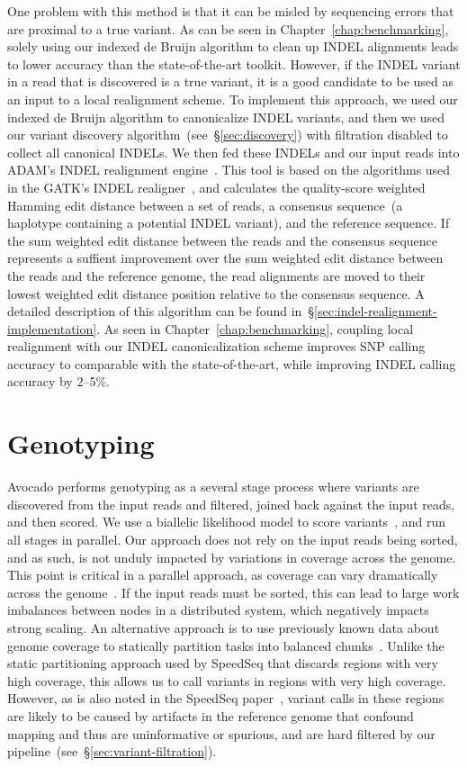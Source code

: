 \documentclass[phd]{ucbthesis}
\begin{document}
One problem with this method is that it can be misled by sequencing errors
that are proximal to a true variant. As can be seen in Chapter~\ref{chap:benchmarking},
solely using our indexed de Bruijn algorithm to clean up INDEL alignments leads
to lower accuracy than the state-of-the-art toolkit. However, if the INDEL
variant in a read that is discovered is a true variant, it is a good candidate
to be used as an input to a local realignment scheme.  To implement this
approach, we used our indexed de Bruijn algorithm to canonicalize INDEL variants,
and then we used our variant discovery algorithm~(see~\S\ref{sec:discovery})
with filtration disabled to collect all canonical INDELs. We then fed these
INDELs and our input reads into {ADAM}'s INDEL realignment
engine~\cite{massie13, nothaft15}. This tool is based on the algorithms used in
the {GATK}'s INDEL realigner~\cite{depristo11}, and calculates the quality-score
weighted Hamming edit distance between a set of reads, a consensus sequence~(a
haplotype containing a potential INDEL variant), and the reference sequence. If
the sum weighted edit distance between the reads and the consensus sequence
represents a suffient improvement over the sum weighted edit distance between
the reads and the reference genome, the read alignments are moved to their
lowest weighted edit distance position relative to the consensus sequence.
A detailed description of this algorithm can be found in~\S\ref{sec:indel-realignment-implementation}.
As seen in Chapter~\ref{chap:benchmarking}, coupling local realignment with our INDEL
canonicalization scheme improves SNP calling accuracy to comparable with the
state-of-the-art, while improving INDEL calling accuracy by 2--5\%.

\section{Genotyping}
\label{sec:genotyping}

{Avocado} performs genotyping as a several stage process where variants
are discovered from the input reads and filtered, joined back against the input
reads, and then scored. We use a biallelic likelihood model to score
variants~\cite{li11}, and run all stages in parallel. Our approach does not
rely on the input reads being sorted, and as such, is not unduly impacted by
variations in coverage across the genome. This point is critical in a parallel
approach, as coverage can vary dramatically across the genome~\cite{pinard06}.
If the input reads must be sorted, this can lead to large work imbalances
between nodes in a distributed system, which negatively impacts strong scaling.
An alternative approach is to use previously known data about genome coverage
to statically partition tasks into balanced chunks~\cite{chiang15}. Unlike the
static partitioning approach used by {SpeedSeq} that discards regions with
very high coverage, this allows us to call variants in regions with very high
coverage. However, as is also noted in the {SpeedSeq} paper~\cite{chiang15}, variant calls
in these regions are likely to be caused by artifacts in the reference genome that
confound mapping and thus are uninformative or spurious, and are hard filtered by
our pipeline~(see~\S\ref{sec:variant-filtration}).
\end{document}
